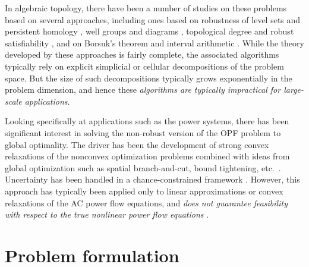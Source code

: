 \documentclass[11pt]{article}
\theoremstyle{plain}
\theoremstyle{definition}
\theoremstyle{remark}
\newcommand{\delete}[1]{\textcolor{red}{#1}}
\newcommand{\modified}[1]{\textcolor{darkgrn}{#1}}
\newcommand{\sym}[1]{\mathcal{S}^{#1}}
\begin{document}
In algebraic topology, there have been a number of studies on these problems based on several approaches, including ones based on robustness of level sets and persistent homology \cite{BeEdMoPa2010,EdMoPa2011}, well groups and diagrams \cite{ChSkPa2012,FrKr2016well,FrKr2016pers}, topological degree and robust satisfiability \cite{FrKr2015,FrKrWa2016},  and on Borsuk's theorem and interval arithmetic \cite{FrRa2015,FrHoLa2007,FrLa2005}.
While the theory developed by these approaches is fairly complete, the associated algorithms typically rely on explicit simplicial or cellular decompositions of the problem space.
But the size of such decompositions typically grows exponentially in the problem dimension, and hence these \emph{algorithms are typically impractical for large-scale applications}.

Looking specifically at applications such as the power systems, there has been significant interest in solving the non-robust version of the OPF problem to global optimality.
The driver has been the development of strong convex relaxations of the nonconvex optimization problems combined with ideas from global optimization such as spatial branch-and-cut, bound tightening, etc.~\cite{BiMu2016,coffrin2015strengthening}.
Uncertainty has been handled in a chance-constrained framework \cite{BiChHa2014,zhang2011chance}.
However, this approach has typically been applied only to linear approximations or convex relaxations of the AC power flow equations, and \emph{does not guarantee feasibility with respect to the true nonlinear power flow equations} \cite{BiChHa2014,kocuk2016strong,RoVrOlAn2015,TsBiTa2016}.


\section{Problem formulation}

\end{document}
